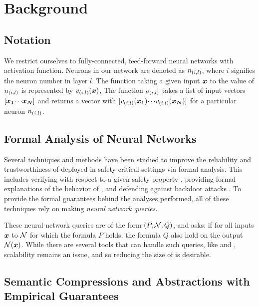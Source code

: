 \section{Background}
\subsection{Notation}

We restrict ourselves to fully-connected, feed-forward neural networks with
\relu activation function. 
Neurons in our network are denoted as $n_{(i,l)}$, where $i$ signifies the 
neuron number in layer $l$.  %
The function taking a given input $\boldsymbol{x}$ to the value of $n_{(i,l)}$ is
represented by $v_{(i,l)}(\boldsymbol{x})$, %
The function $o_{(i,l)}$ takes a list of input vectors
$[\boldsymbol{x_1} {\cdots} \boldsymbol{x_N}]$ and returns a vector with
$[v_{(i,l)}(\boldsymbol{x_1}) {\cdots} v_{(i,l)}(\boldsymbol{x_N})]$ for a particular
neuron $n_{(i,l)}$.  %

\subsection{Formal Analysis of Neural Networks }
\label{s:form-an}

Several techniques and methods have been studied to improve the reliability and
trustworthiness of \dnn deployed in safety-critical settings via formal
analysis. This includes verifying \dnn with respect to a given
safety property
\cite{reluplex,cegar-nn,deeppoly,cegarette,cleverest-nn,conv-abs-gk,deep-abstract,lin-comb-abs-jan},
providing formal explanations of
the behavior of \dnn \cite{minimal-image-fxai,overview-fxai}, and defending
against backdoor attacks \cite{backdoor-verification}.
 To provide the formal guarantees behind the
analyses performed, all of these techniques rely on making \textit{neural
network queries}. 

These neural network queries are of the form $(P, \mathcal{N}, Q)$, and asks: if
for all inputs $\boldsymbol{x}$ to $\mathcal{N}$ for which the formula $P$ holds, 
the formula $Q$ also hold on the output $\mathcal{N}(\boldsymbol{x})$. While there are
several
tools that can handle such queries, like \marabou and \abcrown, scalability
remains an issue, and so reducing the size of \cnc is desirable.

\subsection{Semantic Compressions and Abstractions with Empirical Guarantees}
\label{s:emp-abs}

